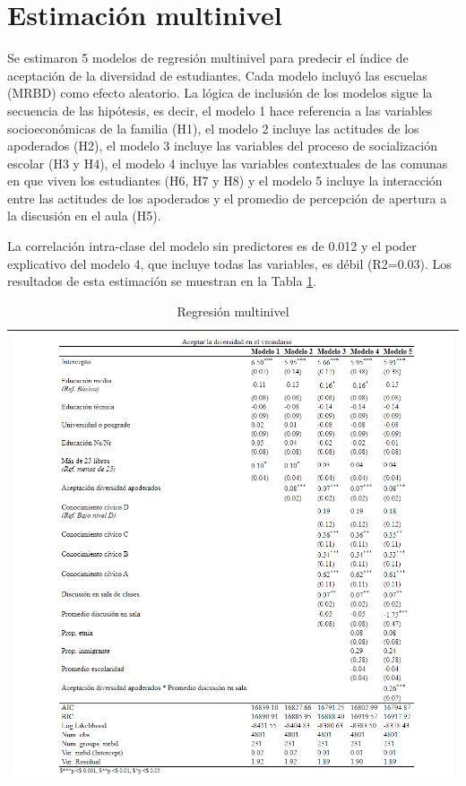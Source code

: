 \documentclass[12pt,twoside]{templates/facsothesis}
\begin{document}
\hypertarget{estimaciuxf3n-multinivel}{%
\section{Estimación multinivel}\label{estimaciuxf3n-multinivel}}

Se estimaron 5 modelos de regresión multinivel para predecir el índice de aceptación de la diversidad de estudiantes. Cada modelo incluyó las escuelas (MRBD) como efecto aleatorio. La lógica de inclusión de los modelos sigue la secuencia de las hipótesis, es decir, el modelo 1 hace referencia a las variables socioeconómicas de la familia (H1), el modelo 2 incluye las actitudes de los apoderados (H2), el modelo 3 incluye las variables del proceso de socialización escolar (H3 y H4), el modelo 4 incluye las variables contextuales de las comunas en que viven los estudiantes (H6, H7 y H8) y el modelo 5 incluye la interacción entre las actitudes de los apoderados y el promedio de percepción de apertura a la discusión en el aula (H5).

La correlación intra-clase del modelo sin predictores es de 0.012 y el poder explicativo del modelo 4, que incluye todas las variables, es débil (R2=0.03). Los resultados de esta estimación se muestran en la Tabla \ref{tab:multinivel}.

\begin{longtable}[]{@{}l@{}}
\caption{\label{tab:multinivel}Regresión multinivel}\tabularnewline
\toprule()
\endhead
\includegraphics{IPO/output/tables/reg.png} \\
\bottomrule()
\end{longtable}
\end{document}
